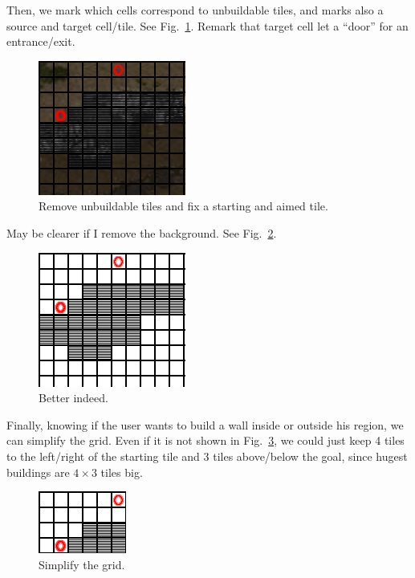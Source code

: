 \documentclass[11pt]{article}
\begin{document}
Then, we mark  which cells correspond to unbuildable  tiles, and marks
also      a      source       and      target      cell/tile.      See
Fig.~\ref{figs:choke_grid_marked}.  Remark  that  target  cell  let  a
``door'' for an entrance/exit.

\begin{figure}[!h]
  \centering
  \includegraphics[width=.4\linewidth]{figs/choke_grid_marked}
  \caption{Remove unbuildable tiles and fix a starting and aimed tile.}
  \label{figs:choke_grid_marked}
\end{figure}

May be clearer if I remove the background. See Fig.~\ref{figs:grid}.

\begin{figure}[!h]
  \centering
  \includegraphics[width=.4\linewidth]{figs/grid}
  \caption{Better indeed.}
  \label{figs:grid}
\end{figure}


Finally, knowing if  the user wants to build a  wall inside or outside
his  region, we can  simplify the  grid. Even  if it  is not  shown in
Fig.~\ref{figs:grid_simplified}, we could just keep 4 tiles to the
left/right  of the  starting tile  and 3  tiles above/below  the goal,
since hugest buildings are $4 \times 3$ tiles big.

\begin{figure}[!h]
  \centering
  \includegraphics[width=.4\linewidth]{figs/grid_simplified}
  \caption{Simplify the grid.}
  \label{figs:grid_simplified}
\end{figure}
\end{document}
